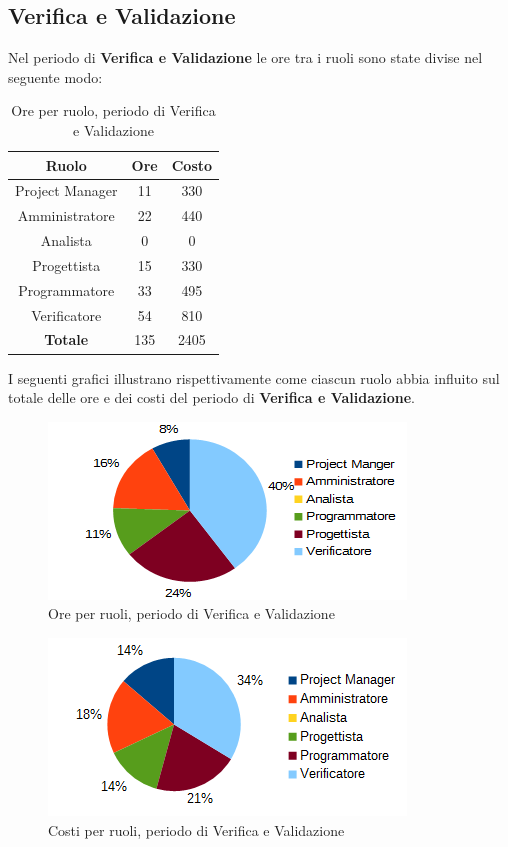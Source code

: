 	\subsection{Verifica e Validazione}
	Nel periodo di \textbf{Verifica e Validazione} le ore tra i ruoli sono state divise nel seguente modo: \\
	\begin{table}[H]
		\centering
		\begin{tabular}{|c|c|c|}
			\hline
			\textbf{Ruolo}		& \textbf{Ore}	& \textbf{Costo} \\
			\hline
			Project Manager		& 11			& 330	\\
			Amministratore		& 22			& 440	\\
			Analista			& 0				& 0	\\
			Progettista			& 15			& 330	\\
			Programmatore		& 33			& 495	\\
			Verificatore		& 54			& 810	\\
			\hline
			\textbf{Totale}		& 135			& 2405	\\
			\hline
		\end{tabular}
		\caption{Ore per ruolo, periodo di Verifica e Validazione}
		\end{table}
	I seguenti grafici illustrano rispettivamente come ciascun ruolo abbia influito sul totale
delle ore e dei costi del periodo di \textbf{Verifica e Validazione}. \\
	\begin{figure}[H]
		\centering
		\includegraphics[width=1\linewidth]{immagini/grafici/validazione-torta.png}
		\caption{Ore per ruoli, periodo di Verifica e Validazione}
	\end{figure}
	\begin{figure}[H]
		\centering
		\includegraphics[width=1\linewidth]{immagini/grafici/validazione-torta-costo.png}
		\caption{Costi per ruoli, periodo di Verifica e Validazione}
	\end{figure}
